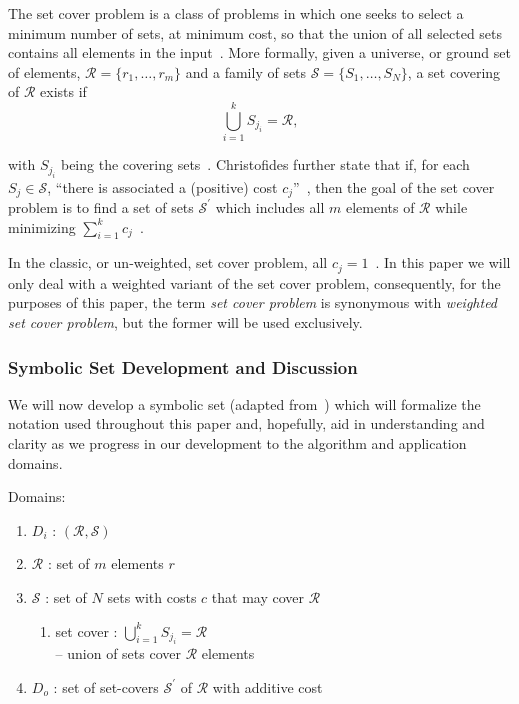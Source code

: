 \documentclass[conference]{IEEEtran}
\begin{document}
The set cover problem is a class of problems in which one seeks to select a
minimum number of sets, at minimum cost, so that the union of all selected sets
contains all elements in the input~\cite{stern2006}.  More formally, given a
universe, or ground set of elements, ${\mathcal{R} = \lbrace r_1,\ldots,r_m
\rbrace}$ and a family of sets ${\mathcal{S} = \lbrace S_1,\ldots,S_N
\rbrace}$, a set covering of $\mathcal{R}$ exists if \[ \bigcup\limits_{i =
1}^k S_{j_i} = \mathcal{R},\]

\noindent with $S_{j_i}$ being the covering sets~\cite[pp.
39-40]{christofides1975}. Christofides further state that if, for each $S_j \in
\mathcal{S}$, ``there is associated a (positive) cost $c_j$''~\cite[p.
39]{christofides1975}, then the goal of the set cover problem is to find a set
of sets $\mathcal{S}^\prime$ which includes all $m$ elements of $\mathcal{R}$
while minimizing $\sum_{i = 1}^k c_j$~\cite{christofides1975, stern2006,
talbi2009, wiki:SCP}. 

In the classic, or un-weighted, set cover problem, all ${c_j =
1}$~\cite{stern2006}. In this paper we will only deal with a weighted variant
of the set cover problem, consequently, for the purposes of this paper, the
term \textit{set cover problem} is synonymous with \textit{weighted set cover
problem}, but the former will be used exclusively.

\subsubsection{Symbolic Set Development and Discussion} \label{sec:symbol}
We will now develop a symbolic set (adapted from~\cite{christofides1975,
lamontSCP}) which will formalize the notation used throughout this paper and,
hopefully, aid in understanding and clarity as we progress in our development
to the algorithm and application domains.

Domains:
\begin{enumerate}
  \item[] $D_i$ : $(\mathcal{R,S})$
  \item[] $\mathcal{R}$ : set of $m$ elements $r$
  \item[] $\mathcal{S}$ : set of $N$ sets with costs $c$ that may cover
    $\mathcal{R}$
    \begin{enumerate}
      \item[] set cover : $\bigcup\limits_{i=1}^k S_{j_i} =
        \mathcal{R}$~\cite[Eq.~3.12]{christofides1975}\\ 
        -- union of sets cover $\mathcal{R}$
        elements
    \end{enumerate}
  \item[] $D_o$ : set of set-covers $\mathcal{S}^\prime$ of $\mathcal{R}$ with
    additive cost
\end{enumerate}
\end{document}
